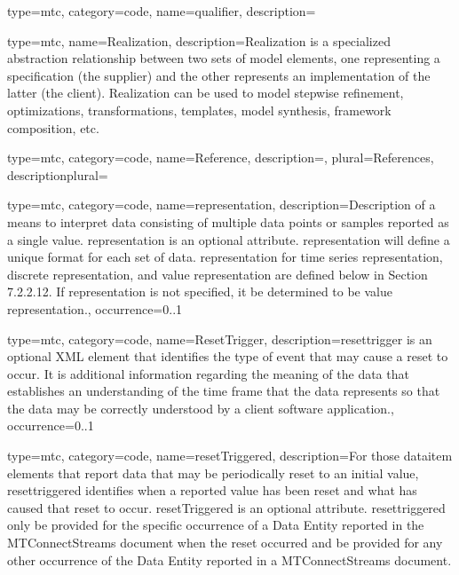 {
  type=mtc,
  category=code,
  name={qualifier},
  description={}
}

{
  type=mtc,
  name={Realization},
  description={Realization is a specialized abstraction relationship between two sets of model elements, one representing a specification (the supplier) and the other represents an implementation of the latter (the client). Realization can be used to model stepwise refinement, optimizations, transformations, templates, model synthesis, framework composition, etc.}
}

{
  type=mtc,
  category=code,
  name={Reference},
  description={},
  plural={References},
  descriptionplural={}
}

{
  type=mtc,
  category=code,
  name={representation},
  description={Description of a means to interpret data consisting of multiple data points or samples reported as a single value.
  \newline \gls{representation} is an optional attribute.
  \newline \gls{representation} will define a unique format for each set of data.
  \newline \gls{representation} for \gls{time series representation}, \gls{discrete representation}, and \gls{value representation} are defined below in Section {\color{red} 7.2.2.12}.
  \newline If \gls{representation} is not specified, it \MUST be determined to be \gls{value representation}.},
  occurrence={0..1}
}

{
  type=mtc,
  category=code,
  name={ResetTrigger},
  description={\gls{resettrigger} is an optional XML element that identifies the type of event that may cause a reset to occur. It is additional information regarding the meaning of the data that establishes an understanding of the time frame that the data represents so that the data may be correctly understood by a client software application.},
  occurrence={0..1}
}

{
  type=mtc,
  category=code,
  name={resetTriggered},
  description={For those \gls{dataitem} elements that report data that may be periodically reset to an initial value, \gls{resettriggered} identifies when a reported value has been reset and what has caused that reset to occur.
  \newline resetTriggered is an optional attribute.
  \newline \gls{resettriggered} \MUST only be provided for the specific occurrence of a Data Entity reported in the MTConnectStreams document when the reset occurred and \MUSTNOT be provided for any other occurrence of the Data Entity reported in a MTConnectStreams document.
}
}

